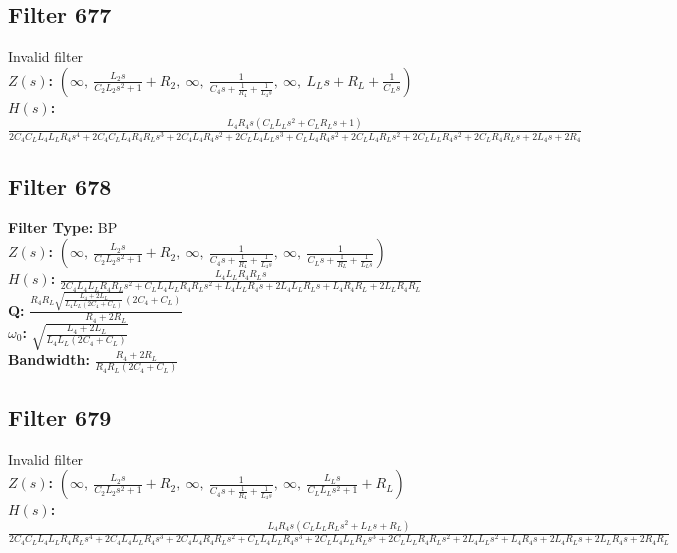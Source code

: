 \documentclass{article}
\begin{document}
\subsection*{Filter 677}
Invalid filter \\ 
\textbf{$Z(s)$:} $\left( \infty, \  \frac{L_{2} s}{C_{2} L_{2} s^{2} + 1} + R_{2}, \  \infty, \  \frac{1}{C_{4} s + \frac{1}{R_{4}} + \frac{1}{L_{4} s}}, \  \infty, \  L_{L} s + R_{L} + \frac{1}{C_{L} s}\right)$ \\ 
\textbf{$H(s)$:} $\frac{L_{4} R_{4} s \left(C_{L} L_{L} s^{2} + C_{L} R_{L} s + 1\right)}{2 C_{4} C_{L} L_{4} L_{L} R_{4} s^{4} + 2 C_{4} C_{L} L_{4} R_{4} R_{L} s^{3} + 2 C_{4} L_{4} R_{4} s^{2} + 2 C_{L} L_{4} L_{L} s^{3} + C_{L} L_{4} R_{4} s^{2} + 2 C_{L} L_{4} R_{L} s^{2} + 2 C_{L} L_{L} R_{4} s^{2} + 2 C_{L} R_{4} R_{L} s + 2 L_{4} s + 2 R_{4}}$ \\ 
\subsection*{Filter 678}
\textbf{Filter Type:} BP \\ 
\textbf{$Z(s)$:} $\left( \infty, \  \frac{L_{2} s}{C_{2} L_{2} s^{2} + 1} + R_{2}, \  \infty, \  \frac{1}{C_{4} s + \frac{1}{R_{4}} + \frac{1}{L_{4} s}}, \  \infty, \  \frac{1}{C_{L} s + \frac{1}{R_{L}} + \frac{1}{L_{L} s}}\right)$ \\ 
\textbf{$H(s)$:} $\frac{L_{4} L_{L} R_{4} R_{L} s}{2 C_{4} L_{4} L_{L} R_{4} R_{L} s^{2} + C_{L} L_{4} L_{L} R_{4} R_{L} s^{2} + L_{4} L_{L} R_{4} s + 2 L_{4} L_{L} R_{L} s + L_{4} R_{4} R_{L} + 2 L_{L} R_{4} R_{L}}$ \\ 
\textbf{Q:} $\frac{R_{4} R_{L} \sqrt{\frac{L_{4} + 2 L_{L}}{L_{4} L_{L} \left(2 C_{4} + C_{L}\right)}} \left(2 C_{4} + C_{L}\right)}{R_{4} + 2 R_{L}}$ \\ 
\textbf{$\omega_0$:} $\sqrt{\frac{L_{4} + 2 L_{L}}{L_{4} L_{L} \left(2 C_{4} + C_{L}\right)}}$ \\ 
\textbf{Bandwidth:} $\frac{R_{4} + 2 R_{L}}{R_{4} R_{L} \left(2 C_{4} + C_{L}\right)}$ \\ 
\subsection*{Filter 679}
Invalid filter \\ 
\textbf{$Z(s)$:} $\left( \infty, \  \frac{L_{2} s}{C_{2} L_{2} s^{2} + 1} + R_{2}, \  \infty, \  \frac{1}{C_{4} s + \frac{1}{R_{4}} + \frac{1}{L_{4} s}}, \  \infty, \  \frac{L_{L} s}{C_{L} L_{L} s^{2} + 1} + R_{L}\right)$ \\ 
\textbf{$H(s)$:} $\frac{L_{4} R_{4} s \left(C_{L} L_{L} R_{L} s^{2} + L_{L} s + R_{L}\right)}{2 C_{4} C_{L} L_{4} L_{L} R_{4} R_{L} s^{4} + 2 C_{4} L_{4} L_{L} R_{4} s^{3} + 2 C_{4} L_{4} R_{4} R_{L} s^{2} + C_{L} L_{4} L_{L} R_{4} s^{3} + 2 C_{L} L_{4} L_{L} R_{L} s^{3} + 2 C_{L} L_{L} R_{4} R_{L} s^{2} + 2 L_{4} L_{L} s^{2} + L_{4} R_{4} s + 2 L_{4} R_{L} s + 2 L_{L} R_{4} s + 2 R_{4} R_{L}}$ \\ 
\end{document}
